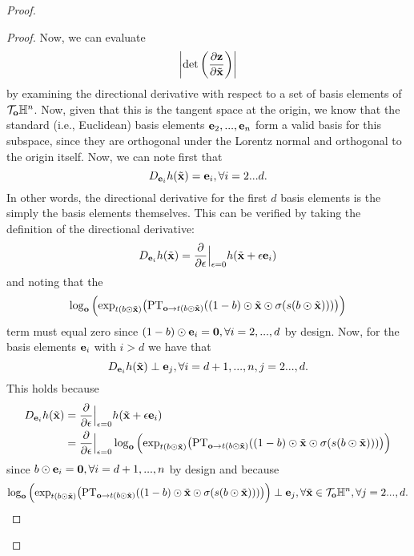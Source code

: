 \begin{proof}
\begin{proof}
Now, we can evaluate 
$$
\left|\textrm{det}\left(\frac{\partial \mathbf{z}}{\partial \tilde{\mathbf{x}}}\right)\right|
$$
by examining the directional derivative with respect to a set of basis elements of $\mathcal{T}_{\mathbf{o}}\mathbb{H}^{n}$.
Now, given that this is the tangent space at the origin, we know that the standard (i.e., Euclidean) basis elements $\mathbf{e}_2, ..., \mathbf{e}_n$ form a valid basis for this subspace, since they are orthogonal under the Lorentz normal and orthogonal to the origin itself. 
Now, we can note first that
\begin{equation}
    D_{\mathbf{e}_i}h(\tilde{\mathbf{x}}) = \mathbf{e}_i, \forall i=2...d.
\end{equation}
In other words, the directional derivative for the first $d$ basis elements is the simply the basis elements themselves. This can be verified by taking the definition of the directional derivative:
\begin{equation}
     D_{\mathbf{e}_i}h(\tilde{\mathbf{x}})  = \frac{\partial}{\partial \epsilon}\Big|_{\epsilon = 0}h(\tilde{\mathbf{x}} + \epsilon\mathbf{e}_i)
\end{equation}
and noting that the 
$$
\log_{\textbf{o}}\Big( \textnormal{exp}_{t(b \odot \tilde{\mathbf{x}})}\big(\textnormal{PT}_{\textbf{o}\to t(b \odot \tilde{\mathbf{x}}) }((1-b) \odot \tilde{\mathbf{x}} \odot \sigma(s(b \odot \tilde{\mathbf{x}})))\big)\Big)
$$
term must equal zero since $(1-b)\odot \mathbf{e}_i = \mathbf{0}, \forall i = 2, ..., d$ by design. 
Now, for the basis elements $\mathbf{e}_i$ with $i>d$ we have that
\begin{equation}
     D_{\mathbf{e}_i}h(\tilde{\mathbf{x}}) \perp \mathbf{e}_j, \forall i=d+1, ..., n, j=2...,d.
\end{equation}
This holds because 
\begin{align}
D_{\mathbf{e}_i}h(\tilde{\mathbf{x}})  &= \frac{\partial}{\partial \epsilon}\Big|_{\epsilon = 0}h(\tilde{\mathbf{x}} + \epsilon\mathbf{e}_i) \\
 &= \frac{\partial}{\partial \epsilon}\Big|_{\epsilon = 0}    \log_{\textbf{o}}\Big( \textnormal{exp}_{t(b \odot \tilde{\mathbf{x}})}\big(\textnormal{PT}_{\textbf{o}\to t(b \odot \tilde{\mathbf{x}}) }((1-b) \odot \tilde{\mathbf{x}} \odot \sigma(s(b \odot \tilde{\mathbf{x}})))\big)\Big) 
\end{align}
since $b \odot \mathbf{e}_i = \mathbf{0}, \forall i = d+1, ..., n$ by design and because
\begin{equation}
   \log_{\textbf{o}}\Big( \textnormal{exp}_{t(b \odot \tilde{\mb{x}})}\big(\textnormal{PT}_{\textbf{o}\to t(b \odot \tilde{\mb{x}}) }((1-b) \odot \tilde{\mb{x}} \odot \sigma(s(b \odot \tildex)))\big)\Big) \perp \mb{e}_j, \forall \tildex \in \mc{T}_\mb{o}\mbb{H}^n, \forall  j=2...,d.

\end{equation}
\end{proof}
\end{proof}
